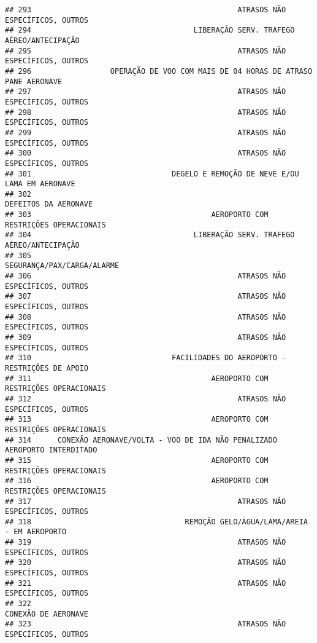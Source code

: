 \documentclass[
]{article}
\begin{document}
\begin{verbatim}
## 293                                               ATRASOS NÃO ESPECÍFICOS, OUTROS
## 294                                     LIBERAÇÃO SERV. TRAFEGO AÉREO/ANTECIPAÇÃO
## 295                                               ATRASOS NÃO ESPECÍFICOS, OUTROS
## 296                  OPERAÇÃO DE VOO COM MAIS DE 04 HORAS DE ATRASO PANE AERONAVE
## 297                                               ATRASOS NÃO ESPECÍFICOS, OUTROS
## 298                                               ATRASOS NÃO ESPECÍFICOS, OUTROS
## 299                                               ATRASOS NÃO ESPECÍFICOS, OUTROS
## 300                                               ATRASOS NÃO ESPECÍFICOS, OUTROS
## 301                                DEGELO E REMOÇÃO DE NEVE E/OU LAMA EM AERONAVE
## 302                                                          DEFEITOS DA AERONAVE
## 303                                         AEROPORTO COM RESTRIÇÕES OPERACIONAIS
## 304                                     LIBERAÇÃO SERV. TRAFEGO AÉREO/ANTECIPAÇÃO
## 305                                                    SEGURANÇA/PAX/CARGA/ALARME
## 306                                               ATRASOS NÃO ESPECÍFICOS, OUTROS
## 307                                               ATRASOS NÃO ESPECÍFICOS, OUTROS
## 308                                               ATRASOS NÃO ESPECÍFICOS, OUTROS
## 309                                               ATRASOS NÃO ESPECÍFICOS, OUTROS
## 310                                FACILIDADES DO AEROPORTO - RESTRIÇÕES DE APOIO
## 311                                         AEROPORTO COM RESTRIÇÕES OPERACIONAIS
## 312                                               ATRASOS NÃO ESPECÍFICOS, OUTROS
## 313                                         AEROPORTO COM RESTRIÇÕES OPERACIONAIS
## 314      CONEXÃO AERONAVE/VOLTA - VOO DE IDA NÃO PENALIZADO AEROPORTO INTERDITADO
## 315                                         AEROPORTO COM RESTRIÇÕES OPERACIONAIS
## 316                                         AEROPORTO COM RESTRIÇÕES OPERACIONAIS
## 317                                               ATRASOS NÃO ESPECÍFICOS, OUTROS
## 318                                   REMOÇÃO GELO/ÁGUA/LAMA/AREIA - EM AEROPORTO
## 319                                               ATRASOS NÃO ESPECÍFICOS, OUTROS
## 320                                               ATRASOS NÃO ESPECÍFICOS, OUTROS
## 321                                               ATRASOS NÃO ESPECÍFICOS, OUTROS
## 322                                                           CONEXÃO DE AERONAVE
## 323                                               ATRASOS NÃO ESPECÍFICOS, OUTROS

\end{verbatim}
\end{document}
